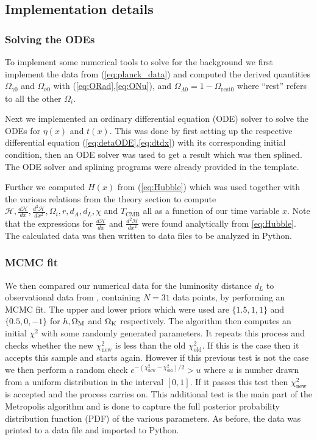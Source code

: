 \documentclass[%
reprint,
 amsmath,amssymb,
 aps,
]{revtex4-2}
\newcommand{\Hp}{\mathcal{H}}
\begin{document}
\subsection{Implementation details}
\subsubsection{Solving the ODEs}
To implement some numerical tools to solve for the background we first implement the data from (\ref{eq:planck_data}) and computed the derived quantities $\Omega_{\gamma0}$ and $\Omega_{\nu0}$ with (\ref{eq:ORad},\ref{eq:ONu}), and $\Omega_{\Lambda0}=1-\Omega_\text{rest0}$ where ``rest'' refers to all the other $\Omega_i$.  

Next we implemented an ordinary differential equation (ODE) solver to solve the ODEs for $\eta(x)$ and $t(x)$. This was done by first setting up the respective differential equation (\ref{eq:detaODE},\ref{eq:dtdx}) with its corresponding initial condition, then an ODE solver was used to get a result which was then splined. The ODE solver and splining programs were already provided in the template. 

Further we computed $H(x)$ from (\ref{eq:Hubble}) which was used together with the various relations from the theory section to compute $\Hp,\frac{d\Hp}{dx},\frac{d^2\Hp}{dx^2},\Omega_i,r,d_A,d_L,\chi$ and $T_{\text{CMB}}$ all as a function of our time variable $x$. Note that the expressions for $\frac{d\Hp}{dx}$ and $\frac{d^2\Hp}{dx^2}$ were found analytically from \ref{eq:Hubble}. The calculated data was then written to data files to be analyzed in Python.
\subsubsection{MCMC fit}
We then compared our numerical data  for the luminosity distance $d_L$ to observational data from \cite{SDSS:2014iwm}, containing $N=31$ data points, by performing an MCMC fit. The upper and lower priors which were used are $\{1.5,1,1\}$ and $\{0.5,0,-1\}$ for $h, \Omega_{\text M}$ and $\Omega_{\text K}$ respectively. The algorithm then computes an initial $\chi^2$ with some randomly generated parameters. It repeats this process and checks whether the new $\chi^2_\text{new}$ is less than the old $\chi^2_\text{old}$. If this is the case then it accepts this sample and starts again. However if this previous test is not the case we then perform a random check $e^{-(\chi^2_\text{new}-\chi_\text{old}^2)/2}>u$ where $u$ is number drawn from a uniform distribution in the interval $[0,1]$. If it passes this test then $\chi^2_\text{new}$ is accepted and the process carries on. This additional test is the main part of the Metropolis algorithm and is done to capture the full posterior probability distribution function (PDF) of the various parameters.  As before, the data was printed to a data file and imported to Python.
\end{document}
